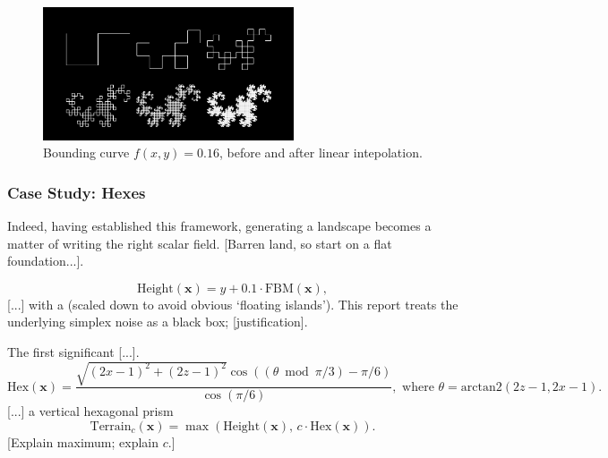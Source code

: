 \documentclass[a4paper, 11pt]{article}
\begin{document}
\begin{flushleft}
\vspace{5pt}\noindent
\begin{figure}[h]
\centering
\includegraphics[width=0.66\textwidth]{Dragon Curves}
\caption{Bounding curve $f(x,y) = 0.16$, before and after linear intepolation.}
\label{Interpolated Marching Squares}
\end{figure}

\newpage
\subsubsection{Case Study: Hexes}

Indeed, having established this framework, generating a landscape becomes a matter of writing the right scalar field. [Barren land, so start on a flat foundation...]. %

$$\textrm{Height}(\mathbf{x}) = y + 0.1\cdot\textrm{FBM}(\mathbf{x}),$$
[...] with a (scaled down to avoid obvious `floating islands'). This report treats the underlying simplex noise as a black box; [justification].

\vspace{5pt}\noindent
The first significant [...].
$$\textrm{Hex}(\mathbf{x}) = \frac{\sqrt{(2x-1)^2+(2z-1)^2}\cos\left((\theta\bmod\pi/3)-\pi/6\right)}{\cos\left(\pi/6\right)}, \,\, \textrm{where} \,\, \theta = \textrm{arctan2}\left(2z-1, 2x-1\right).$$
[...] a vertical hexagonal prism
$$\textrm{Terrain}_c(\mathbf{x}) = \max\left(\textrm{Height}(\mathbf{x}), \, c\cdot\textrm{Hex}(\mathbf{x})\right).$$
[Explain maximum; explain $c$.]%

\vspace{5pt} 


\end{flushleft}
\end{document}
